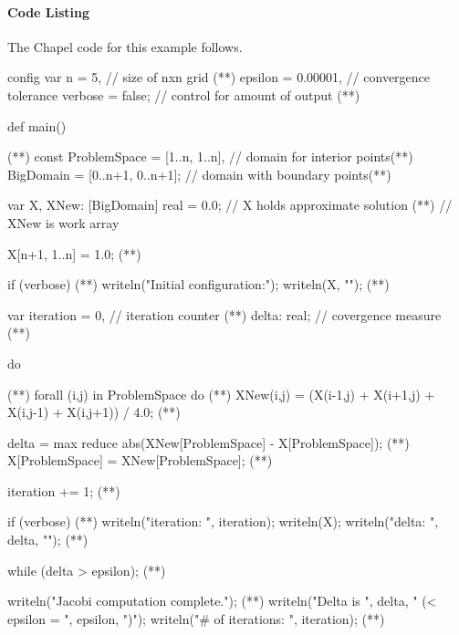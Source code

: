 \paragraph{Code Listing}
The Chapel code for this example follows.  
\begin{numberedchapel}
config var n = 5,                      // size of nxn grid (*\label{jac_config_start}*)
           epsilon = 0.00001,          // convergence tolerance
           verbose = false;            // control for amount of output (*\label{jac_config_end}*)

def main() {                       (*\label{jac_main}*)
  const ProblemSpace = [1..n, 1..n],   // domain for interior points(*\label{problem_space}*)
        BigDomain = [0..n+1, 0..n+1];  // domain with boundary points(*\label{big_domain}*)

  var X, XNew: [BigDomain] real = 0.0; // X holds approximate solution (*\label{a_temp_decl}*)
                                       // XNew is work array

  X[n+1, 1..n] = 1.0;                 (*\label{a_init_last_row}*)

  if (verbose) {                      (*\label{verbose_init_start}*)
    writeln("Initial configuration:");
    writeln(X, "\n");
  }                                   (*\label{verbose_init_end}*)

  var iteration = 0,                  // iteration counter (*\label{jac_var_start}*)
      delta: real;                    // covergence measure (*\label{jac_var_end}*)

  do {                                (*\label{jac_do_start}*)
    forall (i,j) in ProblemSpace do   (*\label{jac_forall}*)
      XNew(i,j) = (X(i-1,j) + X(i+1,j) + X(i,j-1) + X(i,j+1)) / 4.0; (*\label{jac_iter}*)

    delta = max reduce abs(XNew[ProblemSpace] - X[ProblemSpace]); (*\label{jac_reduce}*)
    X[ProblemSpace] = XNew[ProblemSpace]; (*\label{jac_update_X}*)

    iteration += 1; (*\label{jac_advance_iteration}*)

    if (verbose) {  (*\label{verbose_iter_start}*)
      writeln("iteration: ", iteration);
      writeln(X);
      writeln("delta: ", delta, "\n");
    }               (*\label{verbose_iter_end}*)
  } while (delta > epsilon);          (*\label{jac_do_end}*)

  writeln("Jacobi computation complete.");  (*\label{jac_output_start}*)
  writeln("Delta is ", delta, " (< epsilon = ", epsilon, ")");
  writeln("# of iterations: ", iteration); (*\label{jac_output_end}*)
}
\end{numberedchapel}

